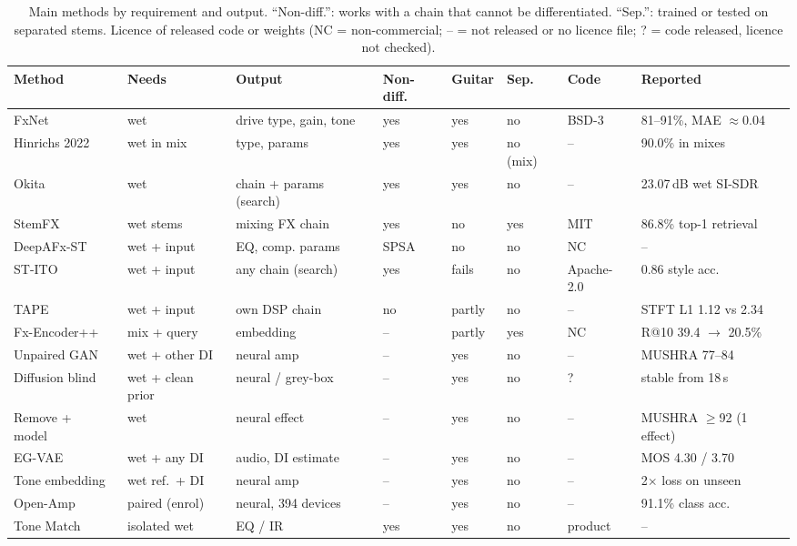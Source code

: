 \begin{table}[t]
\centering
\caption{Main methods by requirement and output. ``Non-diff.'': works with a
chain that cannot be differentiated. ``Sep.'': trained or tested on separated
stems. Licence of released code or weights (NC = non-commercial; -- = not
released or no licence file; ? = code released, licence not checked).}
\label{tab:methods}
\footnotesize
\setlength{\tabcolsep}{3pt}
\begin{tabular}{@{}llllllll@{}}
\toprule
Method & Needs & Output & Non-diff. & Guitar & Sep. & Code & Reported \\
\midrule
FxNet~\cite{comunita2021guitar} & wet & drive type, gain, tone & yes & yes & no & BSD-3 & 81--91\%, MAE $\approx$0.04 \\
Hinrichs 2022~\cite{hinrichs2022convolutional} & wet in mix & type, params & yes & yes & no (mix) & -- & 90.0\% in mixes \\
Okita~\cite{okita2026audio} & wet & chain + params (search) & yes & yes & no & -- & 23.07\,dB wet SI-SDR \\
StemFX~\cite{cheng2026stemfx} & wet stems & mixing FX chain & yes & no & yes & MIT & 86.8\% top-1 retrieval \\
DeepAFx-ST~\cite{steinmetz2022style} & wet + input & EQ, comp. params & SPSA & no & no & NC & -- \\
ST-ITO~\cite{steinmetz2024stito} & wet + input & any chain (search) & yes & fails & no & Apache-2.0 & 0.86 style acc. \\
TAPE~\cite{long2026tape} & wet + input & own DSP chain & no & partly & no & -- & STFT L1 1.12 vs 2.34 \\
Fx-Encoder++~\cite{yeh2025fxencoder} & mix + query & embedding & -- & partly & yes & NC & R@10 39.4 $\to$ 20.5\% \\
Unpaired GAN~\cite{wright2023adversarial} & wet + other DI & neural amp & -- & yes & no & -- & MUSHRA 77--84 \\
Diffusion blind~\cite{moliner2025unsupervised} & wet + clean prior & neural / grey-box & -- & yes & no & ? & stable from 18\,s \\
Remove + model~\cite{hinrichs2024blind} & wet & neural effect & -- & yes & no & -- & MUSHRA $\geq$92 (1 effect) \\
EG-VAE~\cite{yeh2026egvae} & wet + any DI & audio, DI estimate & -- & yes & no & -- & MOS 4.30 / 3.70 \\
Tone embedding~\cite{chen2024zeroshot} & wet ref.\ + DI & neural amp & -- & yes & no & -- & 2$\times$ loss on unseen \\
Open-Amp~\cite{wright2025openamp} & paired (enrol) & neural, 394 devices & -- & yes & no & -- & 91.1\% class acc. \\
Tone Match~\cite{fractalndtonematch} & isolated wet & EQ / IR & yes & yes & no & product & -- \\
\bottomrule
\end{tabular}
\end{table}

